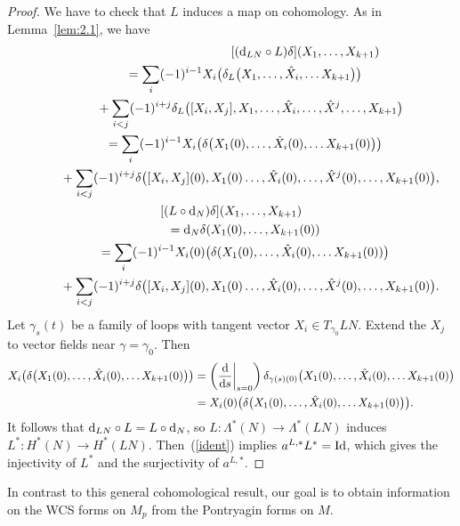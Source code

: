 \documentclass[pdftex]{sigma}
\numberwithin{equation}{section}
\theoremstyle{definition}
\begin{document}
\begin{proof} We have to check that $L$ induces a map on cohomology. As in Lemma~\ref{lem:2.1}, we have
\begin{gather*}\lefteqn{[ ( {\rm d}_{LN}\circ L) \delta](X_1,\dots, X_{k+1})}\\
\qquad{} = \sum_i (-1)^{i-1}X_i\bigl(\delta_L\bigl(X_1,\dots,\hat X_i,\dots X_{k+1} \bigr)\bigr)\\
 \qquad\quad{} + \sum_{i< j}(-1)^{i+j} \delta_L\bigl([X_i,X_j], X_1,\dots, \hat X_i,\dots, \hat X^j,\dots, X_{k+1}\bigr) \\
\qquad{}= \sum_i (-1)^{i-1}X_i\bigl(\delta\bigl(X_1(0),\dots,\hat X_i(0),\dots X_{k+1}(0) \bigr)\bigr)\\
\qquad\quad{} + \sum_{i< j}(-1)^{i+j} \delta\bigl([X_i,X_j](0), X_1(0)\dots, \hat X_i(0),\dots, \hat X^j(0),\dots, X_{k+1}(0)\bigr),\\
[(L\circ {\rm d}_N)\delta](X_1,\dots, X_{k+1})\\
\qquad{}= {\rm d}_N\delta(X_1(0),\dots, X_{k+1}(0)) \\
\qquad{}= \sum_i (-1)^{i-1}X_i(0)\bigl(\delta(X_1(0),\dots,\hat X_i(0),\dots X_{k+1}(0) )\bigr)\\
\qquad\quad{} + \sum_{i< j}(-1)^{i+j} \delta\bigl([X_i,X_j](0), X_1(0)\dots, \hat X_i(0),\dots, \hat X^j(0),\dots, X_{k+1}(0)\bigr).
\end{gather*}
Let $\gamma_s(t)$ be a family of loops with tangent vector $X_i\in T_{\gamma_0}LN$. Extend the $X_j$ to vector fields near $\gamma = \gamma_0$. Then
\begin{align*}X_i \bigl( \delta\bigl(X_1(0),\dots,\hat X_i(0),\dots X_{k+1}(0) \bigr)\bigr) &= \left(\frac{{\rm d}}{{\rm d}s}\biggr|_{s=0} \right) \delta_{\gamma(s)(0)}
\bigl(X_1(0),\dots,\hat X_i(0),\dots X_{k+1}(0)\bigr)\\
& = X_i(0) \bigl( \delta\bigl(X_1(0),\dots,\hat X_i(0),\dots X_{k+1}(0) \bigr)\bigr).
\end{align*}
It follows that $ {\rm d}_{LN}\circ L = L\circ {\rm d}_N$, so
$L\colon \Lambda^*(N)\to\Lambda^*(LN)$ induces $L^*\colon H^*(N) \to H^*(LN)$. Then~(\ref{ident}) implies
$ a^{L,*} L^*= {\rm Id}$, which gives the injectivity of $L^*$ and the surjectivity of $a^{L,*}$.
\end{proof}

In contrast to this general cohomological
result, our goal is to obtain
information on the WCS forms on $M_p$ from the Pontryagin forms on $M$.
\end{document}
